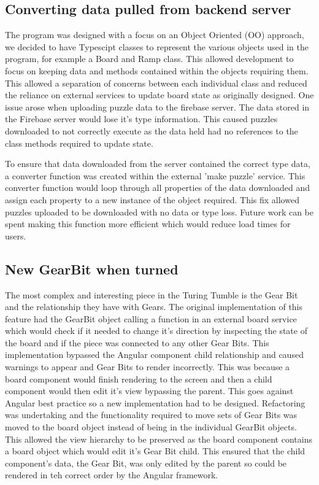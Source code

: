 \documentclass{l4proj}
\begin{document}
\subsection{Converting data pulled from backend server}

The program was designed with a focus on an Object Oriented (OO) approach, we decided to have Typescipt classes to represent the various objects used in the program, for example a Board and Ramp class. This allowed development to focus on keeping data and methods contained within the objects requiring them. This allowed a separation of concerns between each individual class and reduced the reliance on external services to update board state as originally designed. One issue arose when uploading puzzle data to the firebase server. The data stored in the Firebase server would lose it's type information. This caused puzzles downloaded to not correctly execute as the data held had no references to the class methods required to update state. 

To ensure that data downloaded from the server contained the correct type data, a converter function was created within the external 'make puzzle' service. This converter function would loop through all properties of the data downloaded and assign each property to a new instance of the object required. This fix allowed puzzles uploaded to be downloaded with no data or type loss. Future work can be spent making this function more efficient which would reduce load times for users.

\subsection{New GearBit when turned}
The most complex and interesting piece in the Turing Tumble is the Gear Bit and the relationship they have with Gears. The original implementation of this feature had the GearBit object calling a function in an external board service which would check if it needed to change it's direction by inspecting the state of the board and if the piece was connected to any other Gear Bits. This implementation bypassed the Angular component child relationship and caused warnings to appear and Gear Bits to render incorrectly. This was because a board component would finish rendering to the screen and then a child component would then edit it's view bypassing the parent. This goes against Angular best practice so a new implementation had to be designed. Refactoring was undertaking and the functionality required to move sets of Gear Bits was moved to the board object instead of being in the individual GearBit objects. This allowed the view hierarchy to be preserved as the board component contains a board object which would edit it's Gear Bit child. This ensured that the child component's data, the Gear Bit, was only edited by the parent so could be rendered in teh correct order by the Angular framework. 
\end{document}
